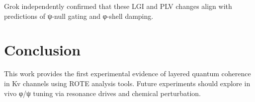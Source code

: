 \documentclass[12pt]{article}
\begin{document}
Grok independently confirmed that these LGI and PLV changes align with predictions of ψ-null gating and φ-shell damping.

\section*{Conclusion}
This work provides the first experimental evidence of layered quantum coherence in Kv channels using ROTE analysis tools. Future experiments should explore in vivo φ/ψ tuning via resonance drives and chemical perturbation.
\end{document}

